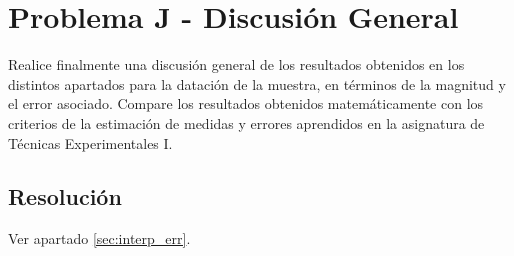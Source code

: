 \section{Problema J - Discusión General}

Realice finalmente una discusión general de los resultados obtenidos en los
distintos apartados para la datación de la muestra, en términos de la magnitud y el error asociado. Compare los resultados obtenidos matemáticamente con los criterios de la estimación de medidas y errores aprendidos en la asignatura de Técnicas Experimentales I.

\subsection{Resolución}

Ver apartado \ref{sec:interp_err}.